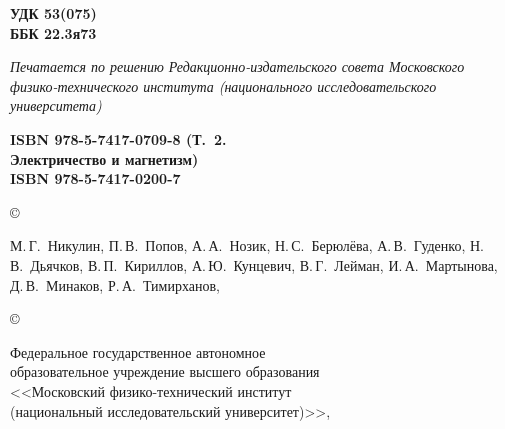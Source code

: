 {\scriptsize
\hfill\parbox{2cm}{\bfseries УДК 53(075)\\
ББК 22.3я73\par}

\vskip 4mm

{\footnotesize\noindent\itshape Печатается по решению Редакционно-издательского совета
    Московского физико-технического института
    (национального исследовательского университета)}

\vskip 4mm

\settowidth{\vva}{\scriptsize\bf Электричество и магнетизм)}%
\noindent
\parbox[t]{\vva}{\scriptsize\bf
ISBN 978-5-7417-0709-8 (Т.~2.\\
Электричество и магнетизм)\\[4pt]
ISBN 978-5-7417-0200-7}
\setlength{\vvc}{\textwidth}%
\addtolength{\vvc}{-0.97\vva}%
\setlength{\vvb}{2.5em}%
\addtolength{\vvc}{-\vvb}%
\hfill
\copyright~\parbox[t]{\vvc}{%
\scriptsize\strut
М.\,Г.~Никулин,
П.\,В.~Попов,
А.\,А.~Нозик,
Н.\,С.~Берюлёва,
А.\,В.~Гуденко,
Н.\,В.~Дьячков,
В.\,П.~Кириллов,
А.\,Ю.~Кунцевич,
В.\,Г.~Лейман,
И.\,А.~Мартынова,
Д.\,В.~Минаков,
Р.\,А.~Тимирханов,
\god}

\smallskip

\hfill
\copyright~\parbox[t]{\vvc}{\raggedright\scriptsize
Федеральное государственное автономное\\
образовательное учреждение высшего образования\\ 
<<Московский физико-технический институт\\ 
(национальный исследовательский университет)>>, \god}



}

